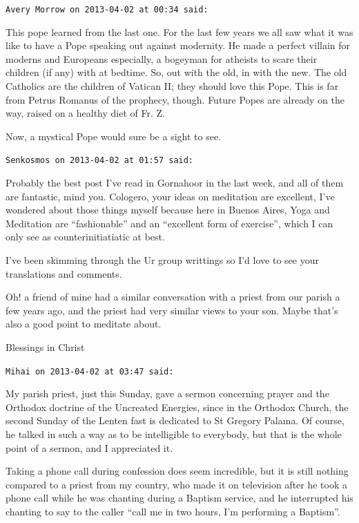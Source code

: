 \begin{footnotesize}
\begin{sffamily}
\texttt{Avery Morrow on 2013-04-02 at 00:34 said:}

This pope learned from the last one. For the last few years we all saw what it was like to have a Pope speaking out against modernity. He made a perfect villain for moderns and Europeans especially, a bogeyman for atheists to scare their children (if any) with at bedtime. So, out with the old, in with the new. The old Catholics are the children of Vatican II; they should love this Pope. This is far from Petrus Romanus of the prophecy, though. Future Popes are already on the way, raised on a healthy diet of Fr. Z.

Now, a mystical Pope would sure be a sight to see.

\hfill

\texttt{Senkosmos on 2013-04-02 at 01:57 said:}

Probably the best post I've read in Gornahoor in the last week, and all of them are fantastic, mind you. Cologero, your ideas on meditation are excellent, I've wondered about those things myself because here in Buenos Aires, Yoga and Meditation are ``fashionable'' and an ``excellent form of exercise'', which I can only see as counterinitiatiatic at best.

I've been skimming through the Ur group writtings so I'd love to see your translations and comments.

Oh! a friend of mine had a similar conversation with a priest from our parish a few years ago, and the priest had very similar views to your son. Maybe that's also a good point to meditate about.

Blessings in Christ

\hfill

\texttt{Mihai on 2013-04-02 at 03:47 said:}

My parish priest, just this Sunday, gave a sermon concerning prayer and the Orthodox doctrine of the Uncreated Energies, since in the Orthodox Church, the second Sunday of the Lenten fast is dedicated to St Gregory Palama. Of course, he talked in such a way as to be intelligible to everybody, but that is the whole point of a sermon, and I appreciated it.

Taking a phone call during confession does seem incredible, but it is still nothing compared to a priest from my country, who made it on television after he took a phone call while he was chanting during a Baptism service, and he interrupted his chanting to say to the caller ``call me in two hours, I'm performing a Baptism''.


\end{sffamily}
\end{footnotesize}
